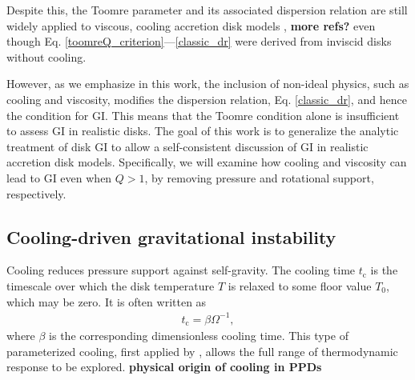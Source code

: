 \documentclass[iop, numberedappendix]{emulateapj}
\newcommand{\p}{\partial}
\newcommand{\tcool}{t_\mathrm{c}}
\begin{document}
Despite this, the Toomre parameter and its associated
dispersion relation are still widely applied to viscous, cooling
accretion disk models \citep[e.g.][]{cossins09, kimura12}, {\bf more refs?}
even though Eq. \ref{toomreQ_criterion}---\ref{classic_dr} were 
derived from inviscid disks without cooling. 

However, as we emphasize in this work, the inclusion of non-ideal
physics, such as cooling and viscosity, modifies the dispersion
relation, Eq. \ref{classic_dr}, and hence the condition for GI. This 
means that the Toomre condition alone is insufficient to assess GI
in realistic disks. The goal of this work is to generalize the
analytic treatment of disk GI to allow a self-consistent discussion of
GI in realistic accretion disk models. Specifically, we will examine
how  cooling and viscosity can lead to GI even when $Q>1$, by 
removing pressure and rotational support, respectively. 


\subsection{Cooling-driven gravitational instability}\label{cool_gi}
Cooling reduces pressure support against self-gravity. The
cooling time  
$\tcool$ is the timescale over which the disk temperature $T$ is relaxed
to some floor value $T_0$, which may be zero. 
 It is often written as 
\begin{align} \label{beta_def}
  \tcool = \beta \Omega^{-1},
\end{align}
where $\beta$ is the corresponding dimensionless cooling time. This
type of parameterized cooling, first applied by \cite{gammie01},
allows the full range of thermodynamic response to be explored. 
{\bf physical origin of cooling in PPDs}
\end{document}
